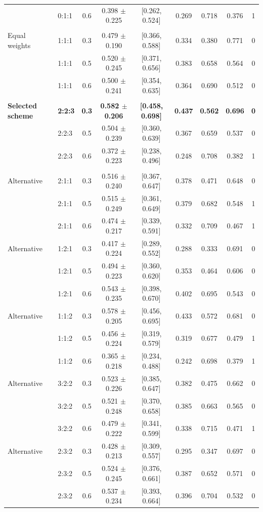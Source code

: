 \begin{tabular}{@{}llcccccc c@{}}
 & 0:1:1 & 0.6 & 0.398 $\pm$ 0.225 & [0.262, 0.524] & 0.269 & 0.718 & 0.376 & 1 \\
\addlinespace[2pt]
\multicolumn{9}{@{}l}{\emph{Equal weights}} \\
\quad Equal weights & 1:1:1 & 0.3 & 0.479 $\pm$ 0.190 & [0.366, 0.588] & 0.334 & 0.380 & 0.771 & 0 \\
 & 1:1:1 & 0.5 & 0.520 $\pm$ 0.245 & [0.371, 0.656] & 0.383 & 0.658 & 0.564 & 0 \\
 & 1:1:1 & 0.6 & 0.500 $\pm$ 0.241 & [0.354, 0.635] & 0.364 & 0.690 & 0.512 & 0 \\
\addlinespace[2pt]
\multicolumn{9}{@{}l}{\emph{Selected}} \\
\textbf{\quad Selected scheme} & \textbf{2:2:3} & \textbf{0.3} & \textbf{0.582 $\pm$ 0.206} & \textbf{[0.458, 0.698]} & \textbf{0.437} & \textbf{0.562} & \textbf{0.696} & \textbf{0} \\
 & 2:2:3 & 0.5 & 0.504 $\pm$ 0.239 & [0.360, 0.639] & 0.367 & 0.659 & 0.537 & 0 \\
 & 2:2:3 & 0.6 & 0.372 $\pm$ 0.223 & [0.238, 0.496] & 0.248 & 0.708 & 0.382 & 1 \\
\addlinespace[2pt]
\multicolumn{9}{@{}l}{\emph{Alternative}} \\
\quad Alternative & 2:1:1 & 0.3 & 0.516 $\pm$ 0.240 & [0.367, 0.647] & 0.378 & 0.471 & 0.648 & 0 \\
 & 2:1:1 & 0.5 & 0.515 $\pm$ 0.249 & [0.361, 0.649] & 0.379 & 0.682 & 0.548 & 1 \\
 & 2:1:1 & 0.6 & 0.474 $\pm$ 0.217 & [0.339, 0.591] & 0.332 & 0.709 & 0.467 & 1 \\
\quad Alternative & 1:2:1 & 0.3 & 0.417 $\pm$ 0.224 & [0.289, 0.552] & 0.288 & 0.333 & 0.691 & 0 \\
 & 1:2:1 & 0.5 & 0.494 $\pm$ 0.223 & [0.360, 0.620] & 0.353 & 0.464 & 0.606 & 0 \\
 & 1:2:1 & 0.6 & 0.543 $\pm$ 0.235 & [0.398, 0.670] & 0.402 & 0.695 & 0.543 & 0 \\
\quad Alternative & 1:1:2 & 0.3 & 0.578 $\pm$ 0.205 & [0.456, 0.695] & 0.433 & 0.572 & 0.681 & 0 \\
 & 1:1:2 & 0.5 & 0.456 $\pm$ 0.224 & [0.319, 0.579] & 0.319 & 0.677 & 0.479 & 1 \\
 & 1:1:2 & 0.6 & 0.365 $\pm$ 0.218 & [0.234, 0.488] & 0.242 & 0.698 & 0.379 & 1 \\
\quad Alternative & 3:2:2 & 0.3 & 0.523 $\pm$ 0.226 & [0.385, 0.647] & 0.382 & 0.475 & 0.662 & 0 \\
 & 3:2:2 & 0.5 & 0.521 $\pm$ 0.248 & [0.370, 0.658] & 0.385 & 0.663 & 0.565 & 0 \\
 & 3:2:2 & 0.6 & 0.479 $\pm$ 0.222 & [0.341, 0.599] & 0.338 & 0.715 & 0.471 & 1 \\
\quad Alternative & 2:3:2 & 0.3 & 0.428 $\pm$ 0.213 & [0.309, 0.557] & 0.295 & 0.347 & 0.697 & 0 \\
 & 2:3:2 & 0.5 & 0.524 $\pm$ 0.245 & [0.376, 0.661] & 0.387 & 0.652 & 0.571 & 0 \\
 & 2:3:2 & 0.6 & 0.537 $\pm$ 0.234 & [0.393, 0.664] & 0.396 & 0.704 & 0.532 & 0 \\
\bottomrule
\end{tabular}%
